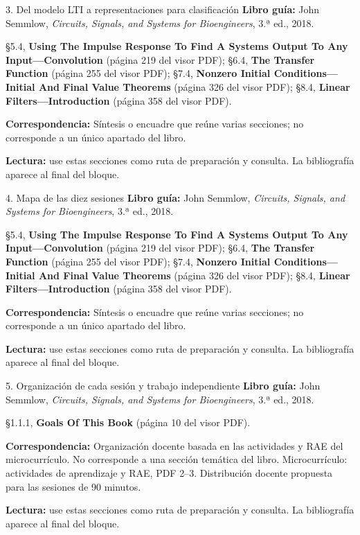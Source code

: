 \documentclass[
  10pt,
  ignorenonframetext,
  aspectratio=169,
  spanish,
]{beamer}
\begin{document}
\begin{frame}{3. Del modelo LTI a representaciones para clasificación}
\label{del-modelo-lti-a-representaciones-para-clasificaciuxf3n}
\textbf{Libro guía:} John Semmlow, \emph{Circuits, Signals, and Systems
for Bioengineers}, 3.ª ed., 2018.

§5.4, \textbf{Using The Impulse Response To Find A Systems Output To Any
Input---Convolution} (página 219 del visor PDF); §6.4, \textbf{The
Transfer Function} (página 255 del visor PDF); §7.4, \textbf{Nonzero
Initial Conditions---Initial And Final Value Theorems} (página 326 del
visor PDF); §8.4, \textbf{Linear Filters---Introduction} (página 358 del
visor PDF).

\textbf{Correspondencia:} Síntesis o encuadre que reúne varias
secciones; no corresponde a un único apartado del libro.

\textbf{Lectura:} use estas secciones como ruta de preparación y
consulta. La bibliografía aparece al final del bloque.
\end{frame}

\begin{frame}{4. Mapa de las diez sesiones}
\label{mapa-de-las-diez-sesiones-2}
\textbf{Libro guía:} John Semmlow, \emph{Circuits, Signals, and Systems
for Bioengineers}, 3.ª ed., 2018.

§5.4, \textbf{Using The Impulse Response To Find A Systems Output To Any
Input---Convolution} (página 219 del visor PDF); §6.4, \textbf{The
Transfer Function} (página 255 del visor PDF); §7.4, \textbf{Nonzero
Initial Conditions---Initial And Final Value Theorems} (página 326 del
visor PDF); §8.4, \textbf{Linear Filters---Introduction} (página 358 del
visor PDF).

\textbf{Correspondencia:} Síntesis o encuadre que reúne varias
secciones; no corresponde a un único apartado del libro.

\textbf{Lectura:} use estas secciones como ruta de preparación y
consulta. La bibliografía aparece al final del bloque.
\end{frame}

\begin{frame}{5. Organización de cada sesión y trabajo independiente}
\label{organizaciuxf3n-de-cada-sesiuxf3n-y-trabajo-independiente-2}
\textbf{Libro guía:} John Semmlow, \emph{Circuits, Signals, and Systems
for Bioengineers}, 3.ª ed., 2018.

§1.1.1, \textbf{Goals Of This Book} (página 10 del visor PDF).

\textbf{Correspondencia:} Organización docente basada en las actividades
y RAE del microcurrículo. No corresponde a una sección temática del
libro. Microcurrículo: actividades de aprendizaje y RAE, PDF 2--3.
Distribución docente propuesta para las sesiones de 90 minutos.

\textbf{Lectura:} use estas secciones como ruta de preparación y
consulta. La bibliografía aparece al final del bloque.
\end{frame}
\end{document}
